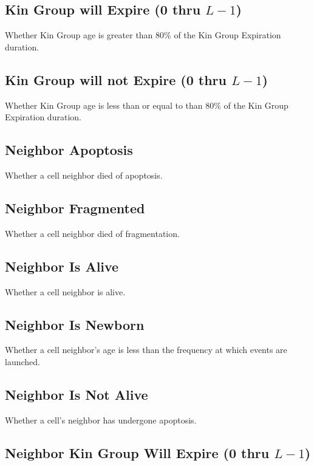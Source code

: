 \subsection{Kin Group will Expire (0 thru $L-1$)}

Whether Kin Group age is greater than 80\% of the Kin Group Expiration duration.

\subsection{Kin Group will not Expire (0 thru $L-1$)}

Whether Kin Group age is less than or equal to than 80\% of the Kin Group Expiration duration.

\subsection{Neighbor Apoptosis}

Whether a cell neighbor died of apoptosis.

\subsection{Neighbor Fragmented}

Whether a cell neighbor died of fragmentation.

\subsection{Neighbor Is Alive}

Whether a cell neighbor is alive.

\subsection{Neighbor Is Newborn}

Whether a cell neighbor's age is less than the frequency at which events are launched.

\subsection{Neighbor Is Not Alive}

Whether a cell's neighbor has undergone apoptosis.

\subsection{Neighbor Kin Group Will Expire (0 thru $L-1$)}

